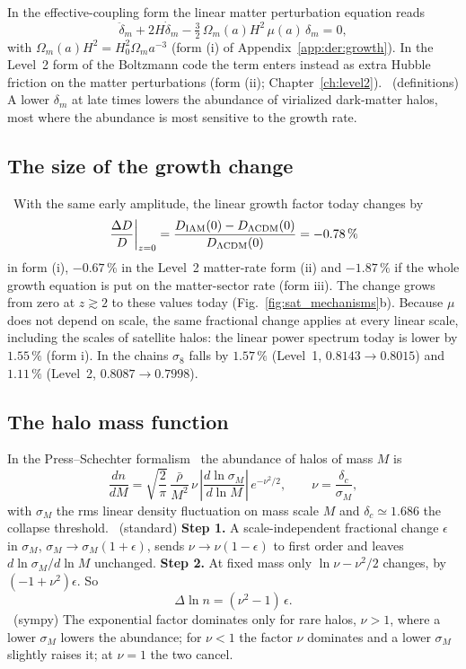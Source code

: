In the effective-coupling form the linear matter perturbation equation reads
\begin{equation}
\ddot\delta_m+2H\dot\delta_m-\tfrac32\,\Omega_m(a)H^2\,\mu(a)\,\delta_m=0,
\label{eq:ms_growth}\end{equation}
with $\Omega_m(a)H^2=H_0^2\Omega_ma^{-3}$ (form (i) of Appendix~\ref{app:der:growth}). In the Level~2 form of the Boltzmann code the term enters instead
as extra Hubble friction on the matter perturbations (form (ii); Chapter~\ref{ch:level2}). \derived\ (definitions) A lower $\delta_m$ at late times lowers
the abundance of virialized dark-matter halos, most where the abundance is most sensitive to the growth rate.

\subsection{The size of the growth change}
\calc\ With the same early amplitude, the linear growth factor today changes by
\begin{equation}
\left.\frac{\Delta D}{D}\right|_{z=0}=\frac{D_{\rm IAM}(0)-D_{\Lambda\rm CDM}(0)}{D_{\Lambda\rm CDM}(0)}=-0.78\,\%
\label{eq:ms_dD}\end{equation}
in form (i), $-0.67\,\%$ in the Level~2 matter-rate form (ii) and $-1.87\,\%$ if the whole growth equation is put on the matter-sector rate (form iii). The change
grows from zero at $z\gtrsim2$ to these values today (Fig.~\ref{fig:sat_mechanisms}b). Because $\mu$ does not depend on scale, the same fractional change
applies at every linear scale, including the scales of satellite halos: the linear power spectrum today is lower by $1.55\,\%$ (form i). In the chains
$\sigma_8$ falls by $1.57\,\%$ (Level~1, $0.8143\to0.8015$) and $1.11\,\%$ (Level~2, $0.8087\to0.7998$).

\subsection{The halo mass function}
In the Press--Schechter formalism~\cite{PressSchechter1974} the abundance of halos of mass $M$ is
\begin{equation}
\frac{dn}{dM}=\sqrt{\frac2\pi}\,\frac{\bar\rho}{M^2}\,\nu\,\left|\frac{d\ln\sigma_M}{d\ln M}\right|\,e^{-\nu^2/2},\qquad\nu=\frac{\delta_c}{\sigma_M},
\label{eq:ms_psmf}\end{equation}
with $\sigma_M$ the rms linear density fluctuation on mass scale $M$ and $\delta_c\simeq1.686$ the collapse threshold. \derived\ (standard)
\textbf{Step 1.} A scale-independent fractional change $\epsilon$ in $\sigma_M$, $\sigma_M\to\sigma_M(1+\epsilon)$, sends $\nu\to\nu(1-\epsilon)$ to first
order and leaves $d\ln\sigma_M/d\ln M$ unchanged. \textbf{Step 2.} At fixed mass only $\ln\nu-\nu^2/2$ changes, by $(-1+\nu^2)\epsilon$. So
\begin{equation}
\Delta\ln n=(\nu^2-1)\,\epsilon .
\label{eq:ms_ps}\end{equation}
\derived\ (sympy) The exponential factor dominates only for rare halos, $\nu>1$, where a lower $\sigma_M$ lowers the abundance; for $\nu<1$ the factor $\nu$
dominates and a lower $\sigma_M$ slightly raises it; at $\nu=1$ the two cancel.

